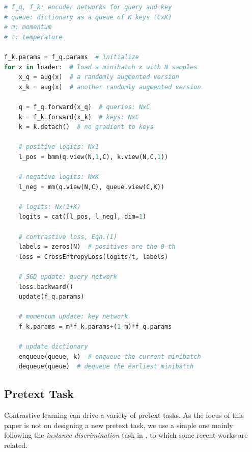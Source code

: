 \documentclass[10pt,twocolumn,letterpaper]{article}
\makeatletter
\let\@algcomment\relax
\newcommand\algcomment[1]{\def\@algcomment{\footnotesize#1}}
\makeatother
\begin{document}
\begin{algorithm}[t]
\caption{Pseudocode of MoCo in a PyTorch-like style.}
\label{alg:code}
\algcomment{\fontsize{7.2pt}{0em}\selectfont \texttt{bmm}: batch matrix multiplication; \texttt{mm}: matrix multiplication; \texttt{cat}: concatenation.
}
\begin{lstlisting}[language=python]
# f_q, f_k: encoder networks for query and key
# queue: dictionary as a queue of K keys (CxK)
# m: momentum
# t: temperature

f_k.params = f_q.params  # initialize
for x in loader:  # load a minibatch x with N samples
    x_q = aug(x)  # a randomly augmented version
    x_k = aug(x)  # another randomly augmented version

    q = f_q.forward(x_q)  # queries: NxC
    k = f_k.forward(x_k)  # keys: NxC
    k = k.detach()  # no gradient to keys

    # positive logits: Nx1
    l_pos = bmm(q.view(N,1,C), k.view(N,C,1))

    # negative logits: NxK
    l_neg = mm(q.view(N,C), queue.view(C,K))

    # logits: Nx(1+K)
    logits = cat([l_pos, l_neg], dim=1)

    # contrastive loss, Eqn.(1)
    labels = zeros(N)  # positives are the 0-th
    loss = CrossEntropyLoss(logits/t, labels)

    # SGD update: query network
    loss.backward()
    update(f_q.params)

    # momentum update: key network
    f_k.params = m*f_k.params+(1-m)*f_q.params

    # update dictionary
    enqueue(queue, k)  # enqueue the current minibatch
    dequeue(queue)  # dequeue the earliest minibatch
\end{lstlisting}
\end{algorithm}

\subsection{Pretext Task}
\label{sec:pretext}
Contrastive learning can drive a variety of pretext tasks. As the focus of this paper is not on designing a new pretext task, we use a simple one mainly following the \emph{instance discrimination} task in \cite{Wu2018a}, to which some recent works \cite{Ye2019,Bachman2019} are related. 
\end{document}
